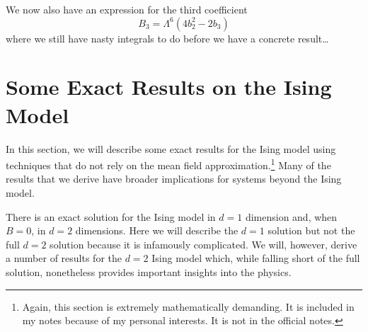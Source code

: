 \documentclass{article}
\theoremstyle{plain}\theoremheaderfont{\normalfont\bfseries}\theorembodyfont{\rmfamily}\theoremseparator{.}\newtheorem*{thm}{Theorem}\newtheorem*{law}{Law}\newtheorem*{pos}{Postulate}
\numberwithin{equation}{section}
\begin{document}
    We now also have an expression for the third coefficient
    \begin{equation}
        B_3=\Lambda^6(4b_2^2-2b_3)
    \end{equation}
    where we still have nasty integrals to do before we have a concrete result\dots

    \section{Some Exact Results on the Ising Model}\label{Chap:Exact_Ising}
    In this section, we will describe some exact results for the Ising model using techniques that do not rely on the mean field approximation.\footnote{Again, this section is extremely mathematically demanding. It is included in my notes because of my personal interests. It is not in the official notes.} Many of the results that we derive have broader implications for systems beyond the Ising model.

    There is an exact solution for the Ising model in \(d=1\) dimension and, when \(B=0\), in \(d=2\) dimensions. Here we will describe the \(d=1\) solution but not the full \(d=2\) solution because it is infamously complicated. We will, however, derive a number of results for the \(d=2\) Ising model which, while falling short of the full solution, nonetheless provides important insights into the physics.
\end{document}
